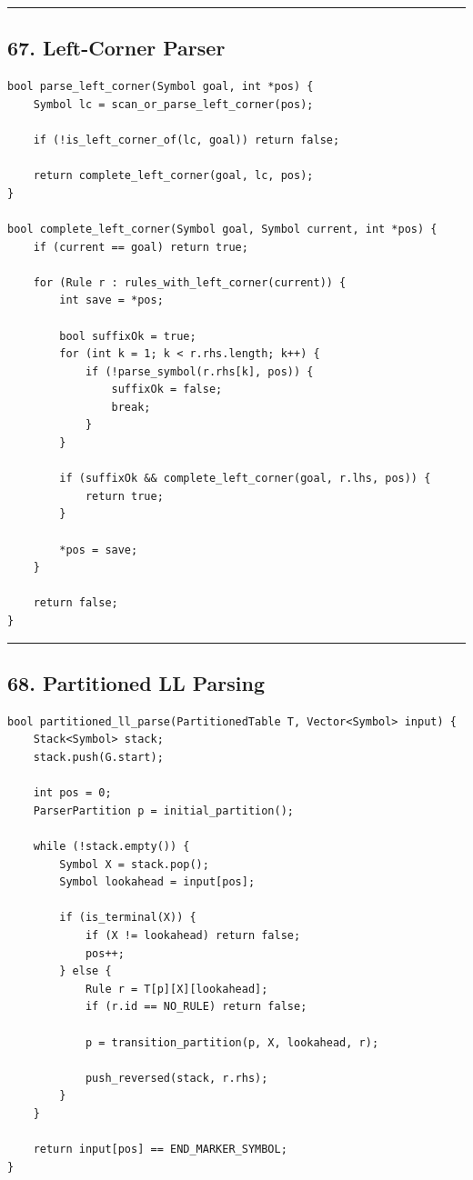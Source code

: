 \documentclass[10pt,letterpaper]{article}
\begin{document}
\medskip\hrule\medskip

\subsection*{67. Left-Corner Parser}

\begin{verbatim}
bool parse_left_corner(Symbol goal, int *pos) {
    Symbol lc = scan_or_parse_left_corner(pos);

    if (!is_left_corner_of(lc, goal)) return false;

    return complete_left_corner(goal, lc, pos);
}

bool complete_left_corner(Symbol goal, Symbol current, int *pos) {
    if (current == goal) return true;

    for (Rule r : rules_with_left_corner(current)) {
        int save = *pos;

        bool suffixOk = true;
        for (int k = 1; k < r.rhs.length; k++) {
            if (!parse_symbol(r.rhs[k], pos)) {
                suffixOk = false;
                break;
            }
        }

        if (suffixOk && complete_left_corner(goal, r.lhs, pos)) {
            return true;
        }

        *pos = save;
    }

    return false;
}
\end{verbatim}

\medskip\hrule\medskip

\subsection*{68. Partitioned LL Parsing}

\begin{verbatim}
bool partitioned_ll_parse(PartitionedTable T, Vector<Symbol> input) {
    Stack<Symbol> stack;
    stack.push(G.start);

    int pos = 0;
    ParserPartition p = initial_partition();

    while (!stack.empty()) {
        Symbol X = stack.pop();
        Symbol lookahead = input[pos];

        if (is_terminal(X)) {
            if (X != lookahead) return false;
            pos++;
        } else {
            Rule r = T[p][X][lookahead];
            if (r.id == NO_RULE) return false;

            p = transition_partition(p, X, lookahead, r);

            push_reversed(stack, r.rhs);
        }
    }

    return input[pos] == END_MARKER_SYMBOL;
}
\end{verbatim}
\end{document}
